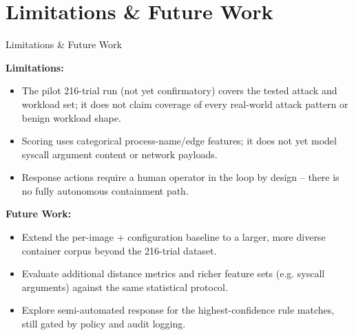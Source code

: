 \documentclass[aspectratio=169, 11pt]{beamer}
\begin{document}
\section{Limitations \& Future Work}
\begin{frame}{Limitations \& Future Work}
\footnotesize

\textbf{Limitations:}
\begin{itemize}
    \item The pilot 216-trial run (not yet confirmatory) covers the tested attack and
    workload set; it does not claim coverage of every real-world attack
    pattern or benign workload shape.
    \item Scoring uses categorical process-name/edge features; it does not
    yet model syscall argument content or network payloads.
    \item Response actions require a human operator in the loop by design
    -- there is no fully autonomous containment path.
\end{itemize}

\medskip
\textbf{Future Work:}
\begin{itemize}
    \item Extend the per-image + configuration baseline to a larger,
    more diverse container corpus beyond the 216-trial dataset.
    \item Evaluate additional distance metrics and richer feature sets
    (e.g. syscall arguments) against the same statistical protocol.
    \item Explore semi-automated response for the highest-confidence
    rule matches, still gated by policy and audit logging.
\end{itemize}
\end{frame}

\end{document}
